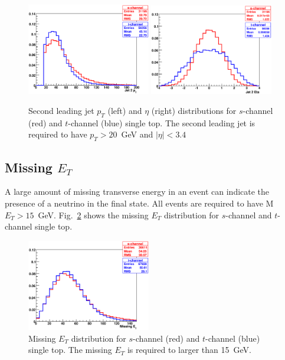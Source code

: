 \begin{figure}[!h!tbp]
\begin{center}
\includegraphics[width=0.48\textwidth]{eps/Analysis/Jet2Pt.eps}
\includegraphics[width=0.48\textwidth]{eps/Analysis/Jet2Eta.eps}
\end{center}
\vspace{-0.1in}
\caption{Second leading jet $p_{T}$ (left) and $\eta$ (right) distributions for $s$-channel (red) and $t$-channel (blue) single top. The second leading jet is required to have $p_{T}>20$~GeV and $|\eta|<3.4$}
\label{stjet2}
\end{figure}


\subsection{Missing $E_{T}$}
\label{missingetselection}

A large amount of missing transverse energy in an event can indicate the presence of a neutrino in the final state. All events are required to have M$E_{T} > 15$~GeV. Fig.~\ref{stmet} shows the missing $E_{T}$ distribution for $s$-channel and $t$-channel single top.

\begin{figure}[!h!tbp]
\begin{center}
\includegraphics[width=0.48\textwidth]{eps/Analysis/MissingEt.eps}
\end{center}
\vspace{-0.1in}
\caption{Missing $E_{T}$ distribution for $s$-channel (red) and $t$-channel (blue) single top. The missing $E_{T}$ is required to larger than 15~GeV.}
\label{stmet}
\end{figure}

